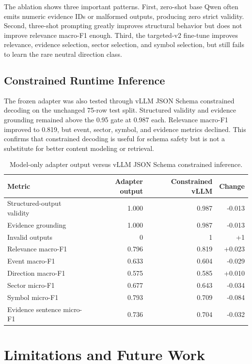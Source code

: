 \documentclass[12pt,a4paper]{report}
\begin{document}
The ablation shows three important patterns. First, zero-shot base Qwen often emits numeric evidence IDs or malformed outputs, producing zero strict validity. Second, three-shot prompting greatly improves structural behavior but does not improve relevance macro-F1 enough. Third, the targeted-v2 fine-tune improves relevance, evidence selection, sector selection, and symbol selection, but still fails to learn the rare neutral direction class.

\section{Constrained Runtime Inference}
The frozen adapter was also tested through vLLM JSON Schema constrained decoding on the unchanged 75-row test split. Structured validity and evidence grounding remained above the 0.95 gate at 0.987 each. Relevance macro-F1 improved to 0.819, but event, sector, symbol, and evidence metrics declined. This confirms that constrained decoding is useful for schema safety but is not a substitute for better content modeling or retrieval.

\begin{table}[htbp]
\centering
\caption{Model-only adapter output versus vLLM JSON Schema constrained inference.}
\label{tab:constrained-inference}
\small
\begin{tabular}{@{}lrrr@{}}
\toprule
Metric & Adapter output & Constrained vLLM & Change \\
\midrule
Structured-output validity & 1.000 & 0.987 & -0.013 \\
Evidence grounding & 1.000 & 0.987 & -0.013 \\
Invalid outputs & 0 & 1 & +1 \\
Relevance macro-F1 & 0.796 & 0.819 & +0.023 \\
Event macro-F1 & 0.633 & 0.604 & -0.029 \\
Direction macro-F1 & 0.575 & 0.585 & +0.010 \\
Sector micro-F1 & 0.677 & 0.643 & -0.034 \\
Symbol micro-F1 & 0.793 & 0.709 & -0.084 \\
Evidence sentence micro-F1 & 0.736 & 0.704 & -0.032 \\
\bottomrule
\end{tabular}
\end{table}

\chapter{Limitations and Future Work}
\end{document}
